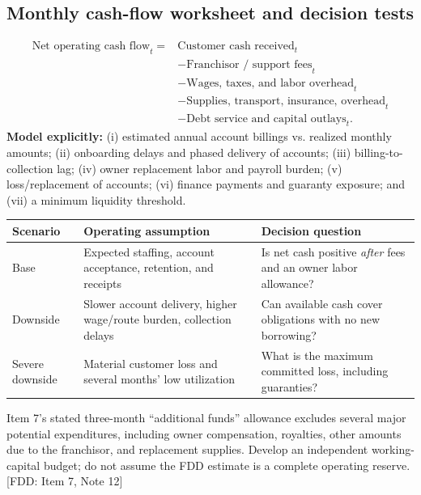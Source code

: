 \documentclass[10pt,letterpaper]{article}
\newcommand{\FDD}[1]{\textsf{\footnotesize\color{Muted} [FDD: #1]}}
\begin{document}
\subsection{Monthly cash-flow worksheet and decision tests}
\begin{align*}
\text{Net operating cash flow}_t={}&\text{Customer cash received}_t\\
&-\text{Franchisor / support fees}_t\\
&-\text{Wages, taxes, and labor overhead}_t\\
&-\text{Supplies, transport, insurance, overhead}_t\\
&-\text{Debt service and capital outlays}_t.
\end{align*}
\textbf{Model explicitly:} (i) estimated annual account billings vs. realized
monthly amounts; (ii) onboarding delays and phased delivery of accounts;
(iii) billing-to-collection lag; (iv) owner replacement labor and payroll
burden; (v) loss/replacement of accounts; (vi) finance payments and guaranty
exposure; and (vii) a minimum liquidity threshold.

\begin{tabularx}{\linewidth}{@{}p{.21\linewidth}Y Y@{}}
\toprule
\textbf{Scenario} & \textbf{Operating assumption} & \textbf{Decision question}\\\midrule
Base & Expected staffing, account acceptance, retention, and receipts & Is net cash positive \emph{after} fees and an owner labor allowance?\\
Downside & Slower account delivery, higher wage/route burden, collection delays & Can available cash cover obligations with no new borrowing?\\
Severe downside & Material customer loss and several months' low utilization & What is the maximum committed loss, including guaranties?\\
\bottomrule
\end{tabularx}

\begin{riskbox}
Item 7's stated three-month ``additional funds'' allowance excludes several
major potential expenditures, including owner compensation, royalties, other
amounts due to the franchisor, and replacement supplies. Develop an
independent working-capital budget; do not assume the FDD estimate is a
complete operating reserve. \FDD{Item 7, Note 12}
\end{riskbox}
\end{document}
